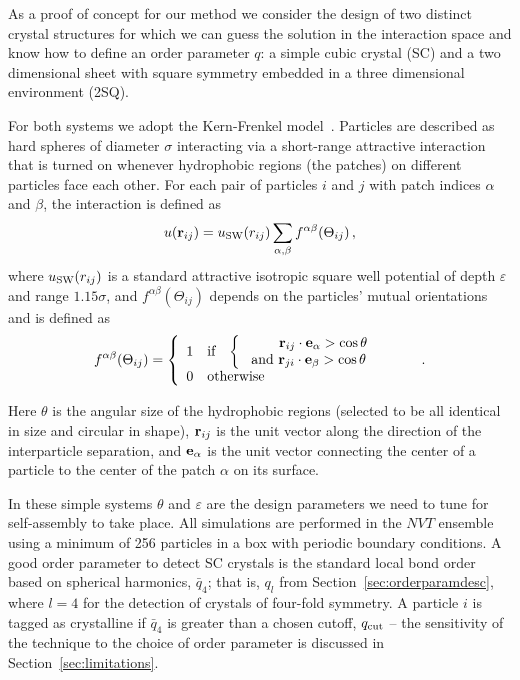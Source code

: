 As a proof of concept for our method we consider the design of two distinct crystal structures for which we can guess the solution in the interaction space and know how to define an order parameter $q$: a simple cubic crystal (SC) and a two dimensional sheet with square symmetry embedded in a three dimensional environment (2SQ).

For both systems we adopt the Kern-Frenkel model~\cite{Kern}. 
Particles are described as hard spheres of diameter $\sigma$ interacting via a short-range attractive interaction that is turned on whenever hydrophobic regions (the patches) on different particles face each other.
For each  pair of particles $i$ and $j$ with patch indices $\alpha$ and $\beta$, the interaction is defined as 
	\begin{equation}
		\label{eq1}
		u(\mathbf{r}_{ij})=u_{\rm SW}(r_{ij}) \sum_{\alpha,\beta}f^{\alpha\beta}(\Theta_{ij}) \,,
	\end{equation}
where $ u_{\rm SW}(r_{ij})$ is a standard attractive isotropic square well potential of depth $\varepsilon$ and range $1.15\sigma$, and $f^{\alpha\beta}(\Theta_{ij})$ depends on the particles' mutual orientations and is defined as
	\begin{equation}
		\label{eq2}
		f^{\alpha\beta}(\Theta_{ij})= \left\{
		\begin{array}{ll}
			1 &\mbox{if \, }\left\{
			\begin{array}{lll} \mbox{ \,\,\,\,\,\,\, \,\,\,${\bf r}_{ij}\cdot{\bf e}_{\alpha}>\cos \theta$ } & \begin{array}{l}\end{array} &\\ 
    			\mbox{ and ${\bf r}_{ji}\cdot{\bf e}_{\beta}>\cos\theta$ } & \begin{array}{l} \end{array}
            \end{array} \right.\\
		0 & \mbox{otherwise}
		\end{array} \right. \,.
	\end{equation}

Here $\theta$ is the angular size of the hydrophobic regions (selected to be all identical in size and circular in shape), ${\bf r}_{ij}$ is the unit vector along the direction of the interparticle separation, and ${\bf e}_{\alpha}$ is the unit vector connecting the center of a particle to the center of the patch $\alpha$ on its surface.
 
In these simple systems $\theta$ and $\varepsilon$ are the design parameters we need to tune for self-assembly to take place.
All simulations are performed in the $NVT$ ensemble using a minimum of 256 particles in a box with periodic boundary conditions.
A good order parameter to detect SC crystals is the standard local bond order based on spherical harmonics, $\bar{q}_4$; that is, $q_l$ from Section~\ref{sec:orderparamdesc}, where $l = 4$ for the detection of crystals of four-fold symmetry.
A particle $i$ is tagged as crystalline if $\bar{q}_4$ is greater than a chosen cutoff, $q_{\rm {cut}}$ -- the sensitivity of the technique to the choice of order parameter is discussed in Section~\ref{sec:limitations}.
 
